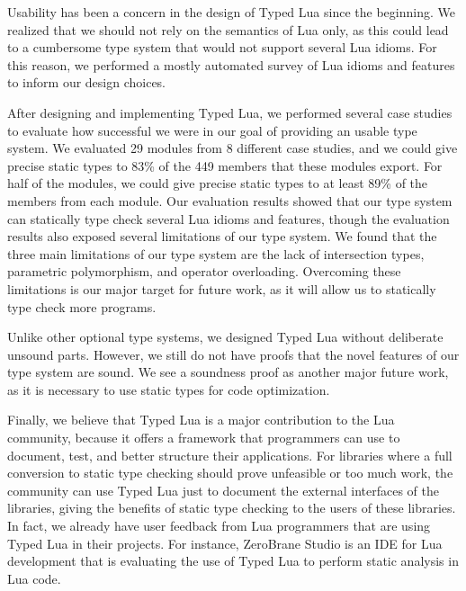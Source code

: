 Usability has been a concern in the design of Typed Lua since the beginning.
We realized that we should not rely on the semantics of Lua only,
as this could lead to a cumbersome type system that would not support
several Lua idioms.
For this reason, we performed a mostly automated survey of Lua idioms
and features to inform our design choices.

After designing and implementing Typed Lua, we performed several
case studies to evaluate how successful we were in our goal of
providing an usable type system.
We evaluated 29 modules from 8 different case studies,
and we could give precise static types to 83\% of the 449
members that these modules export.
For half of the modules, we could give precise static types to
at least 89\% of the members from each module.
Our evaluation results showed that our type system can statically
type check several Lua idioms and features, though the evaluation
results also exposed several limitations of our type system.
We found that the three main limitations of our type system are
the lack of intersection types, parametric polymorphism, and operator overloading.
Overcoming these limitations is our major target for future work,
as it will allow us to statically type check more programs.

Unlike other optional type systems, we designed Typed Lua without
deliberate unsound parts.
However, we still do not have proofs that the novel features of
our type system are sound.
We see a soundness proof as another major future work, as it is
necessary to use static types for code optimization.

Finally, we believe that Typed Lua is a major contribution to the Lua community,
because it offers a framework that programmers can use to document,
test, and better structure their applications.
For libraries where a full conversion to static type checking should
prove unfeasible or too much work, the community can use Typed Lua
just to document the external interfaces of the libraries,
giving the benefits of static type checking to the users of these
libraries.
In fact, we already have user feedback from Lua programmers that are
using Typed Lua in their projects.
For instance, ZeroBrane Studio is an IDE for Lua development that is
evaluating the use of Typed Lua to perform static analysis in Lua code.

